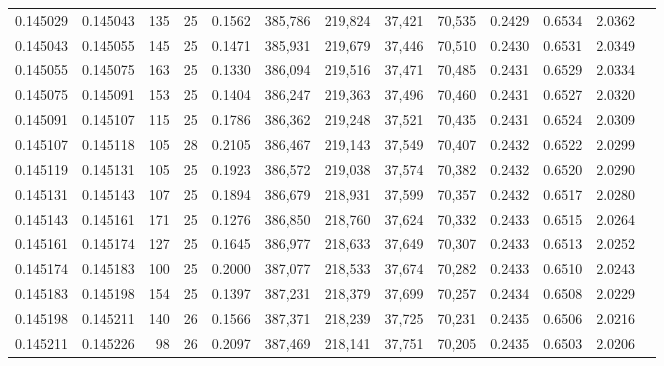 \begin{tabular}{rrrrrrrrrrrrr}
0.145029 & 0.145043 &   135 &  25 &                                     0.1562 & 385,786 & 219,824 &  37,421 &  70,535 & 0.2429 & 0.6534 & 2.0362 \\
0.145043 & 0.145055 &   145 &  25 &                                     0.1471 & 385,931 & 219,679 &  37,446 &  70,510 & 0.2430 & 0.6531 & 2.0349 \\
0.145055 & 0.145075 &   163 &  25 &                                     0.1330 & 386,094 & 219,516 &  37,471 &  70,485 & 0.2431 & 0.6529 & 2.0334 \\
0.145075 & 0.145091 &   153 &  25 &                                     0.1404 & 386,247 & 219,363 &  37,496 &  70,460 & 0.2431 & 0.6527 & 2.0320 \\
0.145091 & 0.145107 &   115 &  25 &                                     0.1786 & 386,362 & 219,248 &  37,521 &  70,435 & 0.2431 & 0.6524 & 2.0309 \\
0.145107 & 0.145118 &   105 &  28 &                                     0.2105 & 386,467 & 219,143 &  37,549 &  70,407 & 0.2432 & 0.6522 & 2.0299 \\
0.145119 & 0.145131 &   105 &  25 &                                     0.1923 & 386,572 & 219,038 &  37,574 &  70,382 & 0.2432 & 0.6520 & 2.0290 \\
0.145131 & 0.145143 &   107 &  25 &                                     0.1894 & 386,679 & 218,931 &  37,599 &  70,357 & 0.2432 & 0.6517 & 2.0280 \\
0.145143 & 0.145161 &   171 &  25 &                                     0.1276 & 386,850 & 218,760 &  37,624 &  70,332 & 0.2433 & 0.6515 & 2.0264 \\
0.145161 & 0.145174 &   127 &  25 &                                     0.1645 & 386,977 & 218,633 &  37,649 &  70,307 & 0.2433 & 0.6513 & 2.0252 \\
0.145174 & 0.145183 &   100 &  25 &                                     0.2000 & 387,077 & 218,533 &  37,674 &  70,282 & 0.2433 & 0.6510 & 2.0243 \\
0.145183 & 0.145198 &   154 &  25 &                                     0.1397 & 387,231 & 218,379 &  37,699 &  70,257 & 0.2434 & 0.6508 & 2.0229 \\
0.145198 & 0.145211 &   140 &  26 &                                     0.1566 & 387,371 & 218,239 &  37,725 &  70,231 & 0.2435 & 0.6506 & 2.0216 \\
0.145211 & 0.145226 &    98 &  26 &                                     0.2097 & 387,469 & 218,141 &  37,751 &  70,205 & 0.2435 & 0.6503 & 2.0206 \\

\end{tabular}
